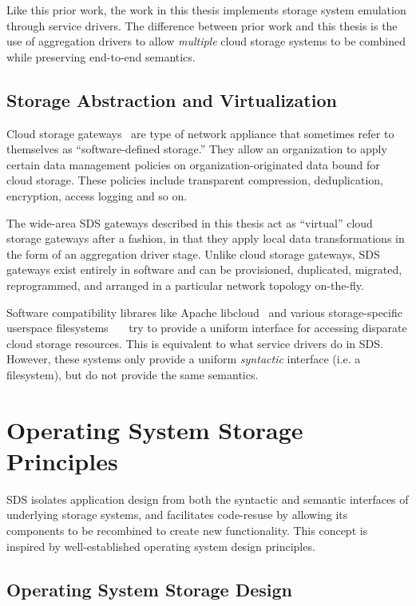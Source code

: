 Like this prior work, the work in this thesis implements storage system emulation
through service drivers.  The difference between prior work and this thesis is
the use of aggregation drivers to allow \emph{multiple} cloud storage systems to
be combined while preserving end-to-end semantics.

\subsection{Storage Abstraction and Virtualization}

Cloud storage gateways~\cite{cloud-storage-gateway} are type of
network appliance that sometimes refer to themselves as ``software-defined storage.''
They allow an organization to apply certain data management
policies on organization-originated data bound for cloud storage.  These
policies include transparent compression, deduplication, encryption, access
logging and so on.

The wide-area SDS gateways described in this thesis act as ``virtual'' cloud
storage gateways after a fashion, in that they apply local data transformations in the form of
an aggregation driver stage.  Unlike cloud storage gateways, SDS gateways exist
entirely in software and can be provisioned, duplicated, migrated,
reprogrammed, and arranged in a particular network topology on-the-fly.

Software compatibility librares like Apache libcloud~\cite{libcloud} and various
storage-specific userspace
filesystems~\cite{s3fs}~\cite{dropbox}~\cite{google-drive-fs} try to
provide a uniform interface for accessing disparate cloud storage resources.
This is equivalent to what service drivers do in SDS.  However, these systems only provide a uniform
\emph{syntactic} interface (i.e. a filesystem), but do not provide the same
semantics.

\section{Operating System Storage Principles}

SDS isolates application design from both the syntactic and semantic interfaces
of underlying storage systems, and facilitates code-resuse by allowing
its components to be recombined to create new functionality.  This concept is
inspired by well-established operating system design principles.

\subsection{Operating System Storage Design}

